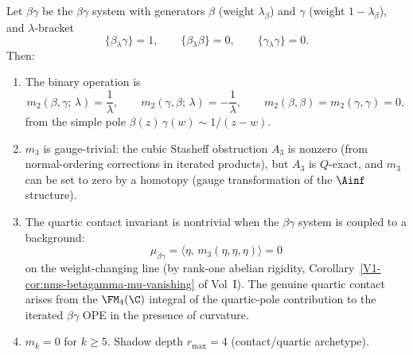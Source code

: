 \begin{theorem}
Let $\beta\gamma$ be the $\beta\gamma$ system with
generators $\beta$ (weight $\lambda_\beta$) and $\gamma$
(weight $1 - \lambda_\beta$), and $\lambda$-bracket
\begin{equation}%
\{\beta{}_\lambda \gamma\} = 1,
\qquad
\{\beta{}_\lambda \beta\} = 0,
\qquad
\{\gamma{}_\lambda \gamma\} = 0.
\end{equation}
Then:
\begin{enumerate}[label=\textup{(\roman*)}]
\item The binary operation is
\begin{equation}%
m_2(\beta, \gamma;\, \lambda)
= \frac{1}{\lambda},
\qquad
m_2(\gamma, \beta;\, \lambda)
= -\frac{1}{\lambda},
\qquad
m_2(\beta,\beta) = m_2(\gamma,\gamma) = 0,
\end{equation}
from the simple pole
$\beta(z)\, \gamma(w) \sim 1/(z-w)$.

\item $m_3$ is gauge-trivial: the cubic Stasheff
obstruction $A_3$ is nonzero (from normal-ordering
corrections in iterated products), but $A_3$ is
$Q$-exact, and $m_3$ can be set to zero by a homotopy
(gauge transformation of the $\Ainf$ structure).

\item The quartic contact invariant is nontrivial when
the $\beta\gamma$ system is coupled to a background:
\begin{equation}%
\mu_{\beta\gamma}
= \langle \eta,\, m_3(\eta,\eta,\eta) \rangle
= 0
\end{equation}
on the weight-changing line (by rank-one abelian
rigidity, Corollary~\ref*{V1-cor:nms-betagamma-mu-vanishing}
of Vol~I). The genuine quartic contact arises from the
$\FM_4(\C)$ integral of the quartic-pole contribution
to the iterated $\beta\gamma$ OPE in the presence of
curvature.

\item $m_k = 0$ for $k \ge 5$. Shadow depth
$r_{\max} = 4$ (contact/quartic archetype).
\end{enumerate}
\end{theorem}

